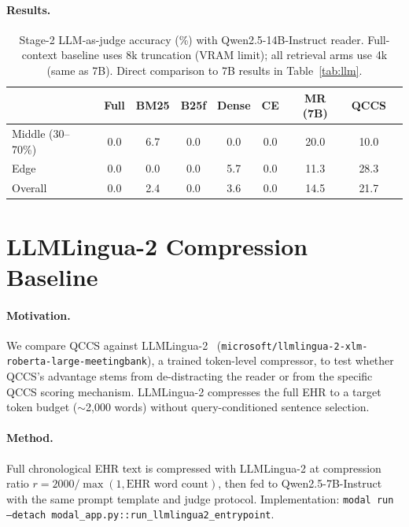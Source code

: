 \documentclass{article}
\begin{document}
\paragraph{Results.}

\begin{table}[H]
\centering
\caption{Stage-2 LLM-as-judge accuracy (\%) with Qwen2.5-14B-Instruct reader.
  Full-context baseline uses 8k truncation (VRAM limit); all retrieval arms use 4k
  (same as 7B). Direct comparison to 7B results in Table~\ref{tab:llm}.}
\label{tab:largerreader}
\small
\begin{tabular}{@{}lcccccccc@{}}
\toprule
 & Full & BM25 & B25f & Dense & CE & MR (7B) & QCCS \\
\midrule
Middle (30--70\%) & 0.0 & 6.7 & 0.0 & 0.0 & 0.0 & 20.0 & 10.0 \\
Edge              & 0.0 & 0.0 & 0.0 & 5.7 & 0.0 & 11.3 & 28.3 \\
Overall           & 0.0 & 2.4 & 0.0 & 3.6 & 0.0 & 14.5 & 21.7 \\
\bottomrule
\end{tabular}
\end{table}


\section{LLMLingua-2 Compression Baseline}
\label{app:llmlingua2}

\paragraph{Motivation.}
We compare QCCS against LLMLingua-2~\cite{pan2024llmlingua2}
(\texttt{microsoft/llmlingua-2-xlm-roberta-large-meetingbank}), a
trained token-level compressor, to test whether QCCS's advantage stems from
de-distracting the reader or from the specific QCCS scoring mechanism.
LLMLingua-2 compresses the full EHR to a target token budget ($\sim$2,000 words)
without query-conditioned sentence selection.

\paragraph{Method.}
Full chronological EHR text is compressed with LLMLingua-2 at compression ratio
$r = 2000 / \max(1, \text{EHR word count})$, then fed to Qwen2.5-7B-Instruct
with the same prompt template and judge protocol. Implementation:
\texttt{modal run --detach modal\_app.py::run\_llmlingua2\_entrypoint}.
\end{document}
